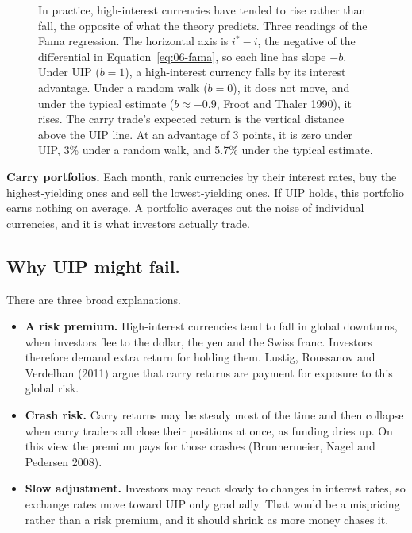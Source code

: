 \begin{figure}[htbp]
{%
}
\caption{In practice, high-interest currencies have tended to rise rather than fall, the opposite of what the theory predicts. Three readings of the Fama regression. The horizontal axis is $i^* - i$, the negative of the differential in Equation~\eqref{eq:06-fama}, so each line has slope $-b$. Under UIP ($b = 1$), a high-interest currency falls by its interest advantage. Under a random walk ($b = 0$), it does not move, and under the typical estimate ($b \approx -0.9$, Froot and Thaler 1990), it rises. The carry trade's expected return is the vertical distance above the UIP line. At an advantage of 3 points, it is zero under UIP, 3\% under a random walk, and 5.7\% under the typical estimate.}
\label{fig:06-fama}
\end{figure}

\textbf{Carry portfolios.} Each month, rank currencies by their interest rates, buy the highest-yielding ones and sell the lowest-yielding ones. If UIP holds, this portfolio earns nothing on average. A portfolio averages out the noise of individual currencies, and it is what investors actually trade.

\subsection{Why UIP might fail.} There are three broad explanations.

\begin{itemize}
  \item \textbf{A risk premium.} High-interest currencies tend to fall in global downturns, when investors flee to the dollar, the yen and the Swiss franc. Investors therefore demand extra return for holding them. Lustig, Roussanov and Verdelhan (2011) argue that carry returns are payment for exposure to this global risk.
  \item \textbf{Crash risk.} Carry returns may be steady most of the time and then collapse when carry traders all close their positions at once, as funding dries up. On this view the premium pays for those crashes (Brunnermeier, Nagel and Pedersen 2008).
  \item \textbf{Slow adjustment.} Investors may react slowly to changes in interest rates, so exchange rates move toward UIP only gradually. That would be a mispricing rather than a risk premium, and it should shrink as more money chases it.
\end{itemize}

